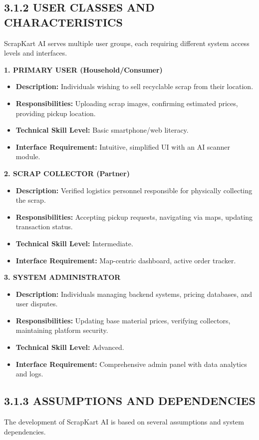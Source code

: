 \subsection{3.1.2 USER CLASSES AND CHARACTERISTICS}
ScrapKart AI serves multiple user groups, each requiring different system access levels and interfaces.

\textbf{1. PRIMARY USER (Household/Consumer)}
\begin{itemize}
    \item \textbf{Description:} Individuals wishing to sell recyclable scrap from their location.
    \item \textbf{Responsibilities:} Uploading scrap images, confirming estimated prices, providing pickup location.
    \item \textbf{Technical Skill Level:} Basic smartphone/web literacy.
    \item \textbf{Interface Requirement:} Intuitive, simplified UI with an AI scanner module.
\end{itemize}

\textbf{2. SCRAP COLLECTOR (Partner)}
\begin{itemize}
    \item \textbf{Description:} Verified logistics personnel responsible for physically collecting the scrap.
    \item \textbf{Responsibilities:} Accepting pickup requests, navigating via maps, updating transaction status.
    \item \textbf{Technical Skill Level:} Intermediate.
    \item \textbf{Interface Requirement:} Map-centric dashboard, active order tracker.
\end{itemize}

\textbf{3. SYSTEM ADMINISTRATOR}
\begin{itemize}
    \item \textbf{Description:} Individuals managing backend systems, pricing databases, and user disputes.
    \item \textbf{Responsibilities:} Updating base material prices, verifying collectors, maintaining platform security.
    \item \textbf{Technical Skill Level:} Advanced.
    \item \textbf{Interface Requirement:} Comprehensive admin panel with data analytics and logs.
\end{itemize}

\subsection{3.1.3 ASSUMPTIONS AND DEPENDENCIES}
The development of ScrapKart AI is based on several assumptions and system dependencies.

